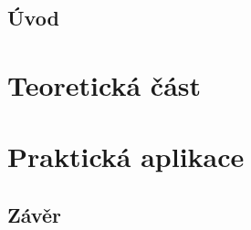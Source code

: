 \documentclass[twoside]{ctuthesis}
\theoremstyle{plainit}
\theoremstyle{definition}
\theoremstyle{note}
\begin{document}
\maketitle

\chapter{Úvod}


\part{Teoretická část}


\part{Praktická aplikace}



\chapter{Závěr}
\lipsum[1]
 










\appendix

\printnomenclature

\printindex



\end{document}
